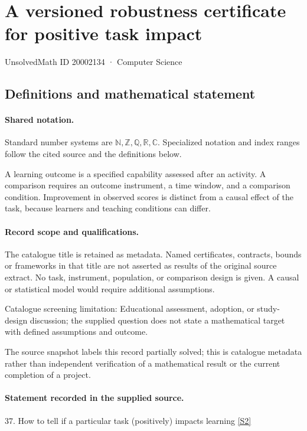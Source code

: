 \documentclass[11pt]{article}
\newcommand{\sref}[2]{\hyperlink{source:#1:#2}{[S#2]}}
\begin{document}
\setcounter{section}{20002133}
\section{A versioned robustness certificate for positive task impact}\label{20002134}
{\small\sffamily UnsolvedMath ID 20002134 · Computer Science}
\subsection{Definitions and mathematical statement}

\paragraph{Shared notation.}Standard number systems are $\mathbb N,\mathbb Z,\mathbb Q,\mathbb R,\mathbb C$. Specialized notation and index ranges follow the cited source and the definitions below.


A learning outcome is a specified capability assessed after an activity. A comparison requires an outcome instrument, a time window, and a comparison condition. Improvement in observed scores is distinct from a causal effect of the task, because learners and teaching conditions can differ.
\paragraph{Record scope and qualifications.}
The catalogue title is retained as metadata. Named certificates, contracts, bounds or frameworks in that title are not asserted as results of the original source extract.
No task, instrument, population, or comparison design is given. A causal or statistical model would require additional assumptions.

Catalogue screening limitation: Educational assessment, adoption, or study-design discussion; the supplied question does not state a mathematical target with defined assumptions and outcome.

The source snapshot labels this record partially solved; this is catalogue metadata rather than independent verification of a mathematical result or the current completion of a project.
\paragraph{Statement recorded in the supplied source.}
37. How to tell if a particular task (positively) impacts learning \sref{20002134}{2}
\end{document}
